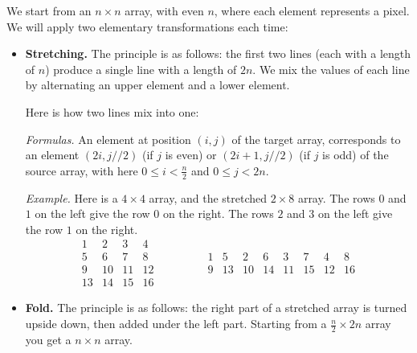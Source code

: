 \documentclass[11pt,class=report,crop=false]{standalone}
\begin{document}
\begin{cours}

We start from an $n\times n$ array, with even $n$, where each element represents a pixel. We will apply two elementary transformations each time:

\begin{itemize}
  \item \textbf{Stretching.} The principle is as follows: the first two lines (each with a length of $n$) produce a single line with a length of $2n$. We mix the values of each line by alternating an upper element and a lower element.

\medskip
 

Here is how two lines mix into one:

\medskip

\emph{Formulas.} An element at position $(i,j)$ of the target array, corresponds to an element $(2i,j//2)$ (if $j$ is even) or $(2i+1,j//2)$ (if $j$ is odd) of the source array, with here $0 \le i < \frac n2$ and $0 \le j < 2n$.

\medskip

\emph{Example.} Here is a $4 \times 4$ array, and the stretched $2 \times 8$ array.
The rows $0$ and $1$ on the left give the row $0$ on the right.
The rows $2$ and $3$ on the left give the row $1$ on the right.
$$\begin{array}{cccc} 
  1& 2& 3& 4\\ 
  5& 6& 7& 8\\  
  9&10&11&12\\  
 13&14&15&16  
\end{array}\qquad\qquad 
\begin{array}{cccccccc} 
  1& 5& 2& 6& 3& 7& 4& 8  \\
  9&13&10&14&11&15&12&16
\end{array}$$
  
  \item \textbf{Fold.} The principle is as follows: the right part of a stretched array is turned upside down, then added under the left part. Starting from a $\frac n2 \times 2n$ array you get a $n \times n$ array.

 


\end{itemize}
\end{cours}
\end{document}
